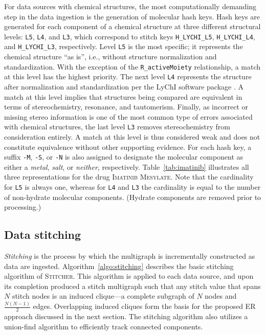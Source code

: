 \documentclass{bmcart}
\newcommand\st{\textsc{Stitcher}}
\begin{document}
For data sources with chemical structures, the most computationally
demanding step in the data ingestion is the generation of molecular hash
keys. Hash keys are generated for each component of a chemical
structure at three different structural levels: 
\texttt{L5}, \texttt{L4}, and \texttt{L3}, which correspond to
stitch keys \texttt{H\_LYCHI\_L5}, \texttt{H\_LYCHI\_L4},
and \texttt{H\_LYCHI\_L3}, respectively. Level \texttt{L5} is the most
specific; it represents the chemical structure ``as is'', i.e., without
structure normalization and standardization. With the exception of the
\texttt{R\_activeMoiety} relationship, a match at this level has the highest
priority. The next level \texttt{L4} represents the structure after 
normalization and standardization per the LyChI software package \cite{lychi}. 
A match at this level implies that structures being compared are equivalent 
in terms of stereochemistry, resonance, and tautomerism. Finally, as incorrect 
or missing stereo information is one of the most common type of errors 
associated with chemical structures, the last level \texttt{L3} removes 
stereochemistry from consideration entirely. A match at this level is thus 
considered weak and does not constitute equivalence without other
supporting evidence. For each hash key, a suffix \texttt{-M},
\texttt{-S}, or \texttt{-N} is also assigned to designate the
molecular component as either a \emph{metal}, \emph{salt}, or
\emph{neither}, respectively. Table~\ref{tab:imatinib} illustrates all
three representations for the drug \textsc{Imatinib Mesylate}. Note
that the cardinality for \texttt{L5} is always one, whereas for
\texttt{L4} and \texttt{L3} the cardinality is equal to the number of
non-hydrate molecular components. (Hydrate components are removed
prior to processing.) 

\subsection*{Data stitching}
\emph{Stitching} is the process by which the multigraph is
incrementally constructed as data are ingested.
Algorithm~\ref{algo:stitching} describes the basic stitching algorithm 
of \st. This algorithm is applied to each data source, and upon its
completion produced a stitch multigraph such that any stitch value
that spans $N$ stitch nodes is an induced clique---a complete
subgraph of $N$ nodes and $\frac{N(N-1)}{2}$ edges. Overlapping
induced cliques form the basis for the proposed ER approach discussed 
in the next section. The stitching algorithm also utilizes a union-find
algorithm \cite{Cormen2001} to efficiently track connected components. 
\end{document}
